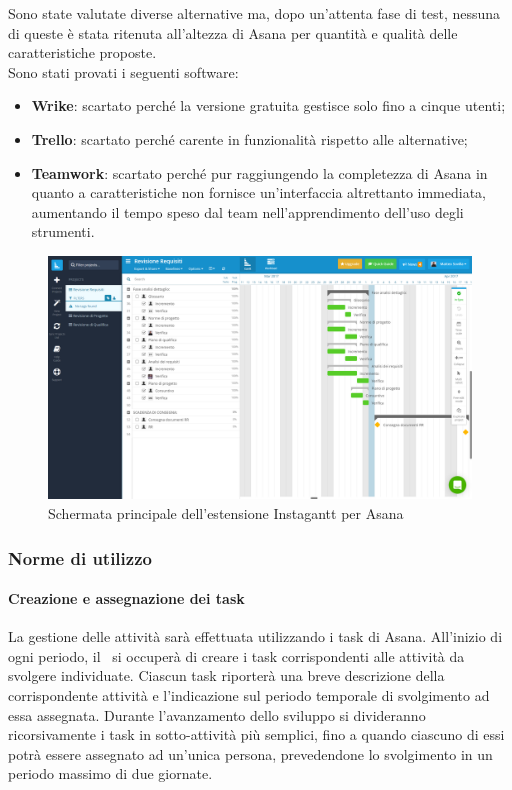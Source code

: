 \documentclass[../NormeDiProgetto.tex]{subfiles}
\begin{document}
				Sono state valutate diverse alternative ma, dopo un'attenta fase di test, nessuna di queste è
				stata ritenuta all'altezza di Asana per quantità e qualità delle caratteristiche proposte.\\
				Sono stati provati i seguenti software:
				\begin{itemize}
					\item \textbf{Wrike}: scartato perché la versione gratuita gestisce solo fino a cinque utenti;
					\item \textbf{Trello}: scartato perché carente in funzionalità rispetto alle alternative;  
					\item \textbf{Teamwork}: scartato perché pur raggiungendo la completezza di Asana in quanto
					a caratteristiche non fornisce un'interfaccia altrettanto immediata, aumentando il tempo
					speso dal team nell'apprendimento dell'uso degli strumenti.
				\end{itemize}
				\begin{figure} [h!]
					\centering
					\includegraphics[scale=0.2]{./Immagini/Instagantt.png}
					\caption{Schermata principale dell'estensione Instagantt per Asana}\label{fig:InstExtAsana}
				\end{figure}
			\subsubsection{Norme di utilizzo}
				\paragraph{Creazione e assegnazione dei task\\}
					La gestione delle attività sarà effettuata utilizzando i task di Asana.
					All'inizio di ogni periodo, il \responsabilediprogetto\ si occuperà di creare i
					task corrispondenti alle attività da svolgere individuate. Ciascun task riporterà
					una breve descrizione della corrispondente attività e l'indicazione sul periodo temporale di
					svolgimento ad essa assegnata. Durante l'avanzamento dello sviluppo si divideranno
					ricorsivamente i task in sotto-attività più semplici, fino a quando ciascuno di essi potrà
					essere assegnato ad un'unica persona, prevedendone lo svolgimento in un periodo massimo di
					due giornate.
\end{document}
